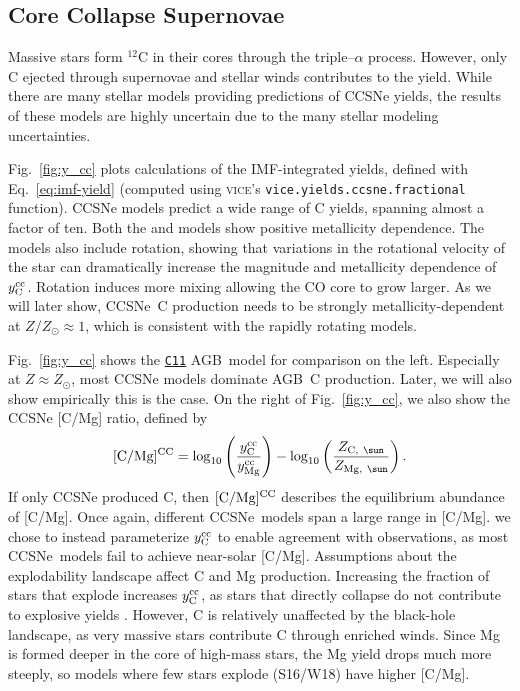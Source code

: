 \documentclass[fleqn,usenatbib]{mnras}
\newcommand{\VICE}{\textsc{vice}}
\newcommand{\cxi}{\texttt{\hyperlink{C11}{C11}}}
\newcommand{\cc}{CCSNe}
\newcommand{\agb}{AGB}
\newcommand{\imf}{IMF}
\newcommand{\hms}{high-mass stars}
\newcommand{\Ycc}{\ensuremath{y_{\rm C}^{\rm cc}}}
\newcommand{\Yoc}{\ensuremath{y_{\rm Mg}^{\rm cc}}}
\begin{document}
\subsection{Core Collapse Supernovae}


Massive stars form $^{12}$C in their cores through the triple--$\alpha$ process. However, only C ejected through supernovae and stellar winds contributes to the yield. 
While there are many stellar models providing predictions of \cc{} yields, the results of these models are highly uncertain due to the many stellar modeling uncertainties. 

Fig.~\ref{fig:y_cc} plots calculations of the \imf-integrated yields, defined with Eq.~\ref{eq:imf-yield} (computed using \VICE's \texttt{vice.yields.ccsne.fractional} function). 
\cc{} models predict a wide range of C yields, spanning almost a factor of ten. 
Both the \citet{NKT13} and \cite{LC18} models show positive metallicity dependence. 
The \cite{LC18} models also include rotation, showing that variations in the rotational velocity of the star can dramatically increase the magnitude and metallicity dependence of $\Ycc$. Rotation induces more mixing allowing the CO core to grow larger. As we will later show, \cc\ C production needs to be strongly metallicity-dependent at $Z/Z_\odot \approx 1$, which is consistent with the \cite{LC18} rapidly rotating models.

Fig.~\ref{fig:y_cc} shows the \cxi{} \agb\ model for comparison on the left. Especially at $Z\approx Z_\odot$, most \cc{} models dominate \agb\ C production. Later, we will also show empirically this is the case.
On the right of Fig.~\ref{fig:y_cc}, we also show the \cc{} [C/Mg] ratio, defined by
\begin{equation}\label{eq:c_mg_cc}
    {\rm [C/Mg]^{CC}} = \log_{10}\left( \frac{\Ycc}{\Yoc}\right) - \log_{10} \left( \frac{Z_{{\rm C},\ \sun }}{Z_{{\rm Mg},\ \sun }} \right).
\end{equation}
If only \cc{} produced C, then ${\rm [C/Mg]^{CC}}$ describes the equilibrium abundance of [C/Mg].
Once again, different \cc\ models span a large range in [C/Mg]. 
we chose to instead parameterize $\Ycc$ to enable agreement with observations, as most \cc\ models fail to achieve near-solar [C/Mg].
Assumptions about the explodability landscape affect C and Mg production. Increasing the fraction of stars that explode increases $\Ycc$, as stars that directly collapse do not contribute to explosive yields \citep{emily+21}. However, C is relatively unaffected by the black-hole landscape, as very massive stars contribute C through enriched winds. Since Mg is formed deeper in the core of \hms, the Mg yield drops much more steeply, so models where few stars explode (S16/W18) have higher [C/Mg].
\end{document}
